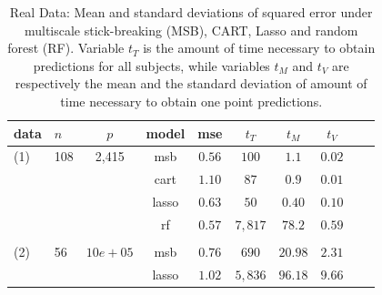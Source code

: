 \documentclass{article} %
\begin{document}
\begin{table}[t]
\caption{Real Data: Mean and standard deviations of squared error under multiscale stick-breaking (MSB), CART, Lasso and random forest (RF). Variable $t_{T}$ is the amount of time necessary to obtain predictions for all subjects, while variables $t_M$ and $t_V$ are respectively the mean and the standard deviation of amount of time necessary to obtain one point predictions.}\label{real}
\vskip 0.15in
\begin{center}
\begin{small}
\begin{sc}
\begin{tabular}{llcccccccc}
\hline
data &$n$&$p$ &model&mse&$t_{T}$ & $t_{M}$ & $t_{V}$\\
\hline
(1)&108&2,415&msb &$0.56$ & $100$ & $1.1$& $0.02$\\
 &&& cart & $1.10$ & $87$ & $0.9$ &$0.01$\\
&&& lasso & $0.63$  & $50$ & $0.40$ & $0.10$\\
&&& rf & $0.57$ &  $7,817$ & $78.2$ & $0.59$\\
\\
  (2)&56&$10e+05$&msb &$0.76$ & $690$ & $20.98$& $2.31$\\
 &&& lasso & $1.02$  & $5,836$ & $96.18$ & $9.66$\\
\hline
\end{tabular}
\end{sc}
\end{small}
\end{center}
\vskip -0.1in
\end{table}


\nocite{langley00}

%
%
%
%


 
 
\end{document}
